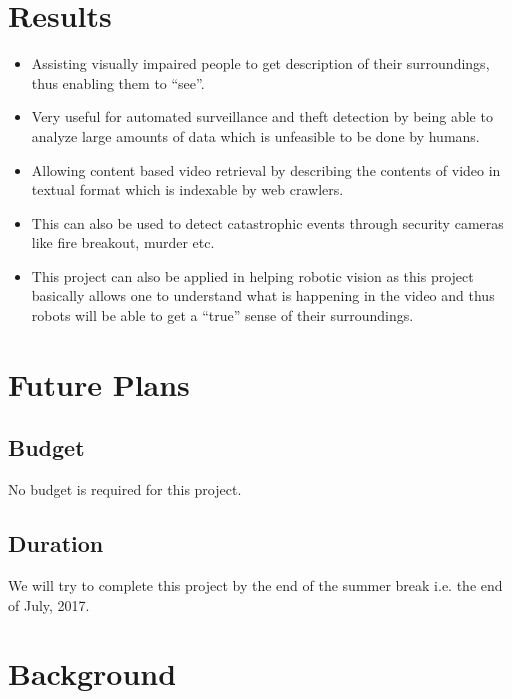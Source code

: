 \documentclass[11pt]{article}
\begin{document}
	\section{Results}
			\begin{itemize}
				\item
					Assisting visually impaired people to get description of their surroundings, thus enabling them to ``see''.
				\item
					Very useful for automated surveillance and theft detection by being able to analyze large amounts of data which is unfeasible to be done by humans.
				\item
					Allowing content based video retrieval by describing the contents of video in textual format which is indexable by web crawlers.
				\item
					This can also be used to detect catastrophic events through security cameras like fire breakout, murder etc.
				\item
					This project can also be applied in helping robotic vision as this project basically allows one to understand what is happening in the video and thus robots will be able to get a ``true'' sense of their surroundings.
			\end{itemize}

	\section{Future Plans}	
		\subsection{Budget}
			No budget is required for this project.			
					
		\subsection{Duration}
			We will try to complete this project by the end of the summer break i.e. the end of July, 2017. 

	\section{Background} 
\end{document}
